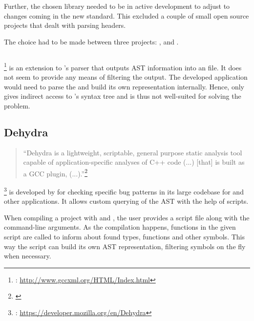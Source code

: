 Further, the chosen library needed to be in active development to adjust to changes coming in the new  standard. This excluded a couple of small open source projects that dealt with parsing  headers.

The choice had to be made between three projects: ,  and .

\subsection{}

\footnote{: \url{http://www.gccxml.org/HTML/Index.html}} is an extension to 's  parser that outputs AST information into an  file. It does not seem to provide any means of filtering the output. The developed application would need to parse the  and build its own representation internally. Hence,  only gives indirect access to 's syntax tree and is thus not well-suited for solving the problem.

\subsection{Dehydra}

\begin{quotation}
``Dehydra is a lightweight, scriptable, general purpose static analysis tool capable of application-specific analyses of C++ code (...) [that] is built as a GCC plugin, (...).''\footnote{\citep{MDNDehydra}}
\end{quotation}

\footnote{: \url{https://developer.mozilla.org/en/Dehydra}} is developed by  for checking specific bug patterns in its large codebase for  and other  applications. It allows custom querying of the AST with the help of  scripts.

When compiling a project with  and , the user provides a script file along with the command-line arguments. As the compilation happens, functions in the given script are called to inform about found types, functions and other symbols. This way the script can build its own AST representation, filtering symbols on the fly when necessary.

